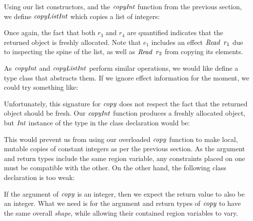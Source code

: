 Using our list constructors, and the $\operatorname{\mathit{copyInt}}$ function from the previous section, we define $\operatorname{\mathit{copyListInt}}$ which copies a list of integers:



Once again, the fact that both $r_3$ and $r_4$ are quantified indicates that the returned object is freshly allocated. Note that $e_1$ includes an effect $\operatorname{\mathit{Read}} \ r_1$ due to inspecting the spine of the list, as well as $\operatorname{\mathit{Read}} \ r_2$ from copying its elements.

As $\operatorname{\mathit{copyInt}}$ and $\operatorname{\mathit{copyListInt}}$ perform similar operations, we would like define a type class that abstracts them. If we ignore effect information for the moment, we could try something like:


Unfortunately, this signature for $\operatorname{\mathit{copy}}$ does not respect the fact that the returned object should be fresh. Our $\operatorname{\mathit{copyInt}}$ function produces a freshly allocated object, but $\operatorname{\mathit{Int}}$ instance of the type in the class declaration would be:


This would prevent us from using our overloaded $\operatorname{\mathit{copy}}$ function to make local, mutable copies of constant integers as per the previous section. As the argument and return types include the same region variable, any constraints placed on one must be compatible with the other. On the other hand, the following class declaration is too weak:


If the argument of $\operatorname{\mathit{copy}}$ is an integer, then we expect the return value to also be an integer. What we need is for the argument and return types of $\operatorname{\mathit{copy}}$ to have the same overall \emph{shape}, while allowing their contained region variables to vary. 

